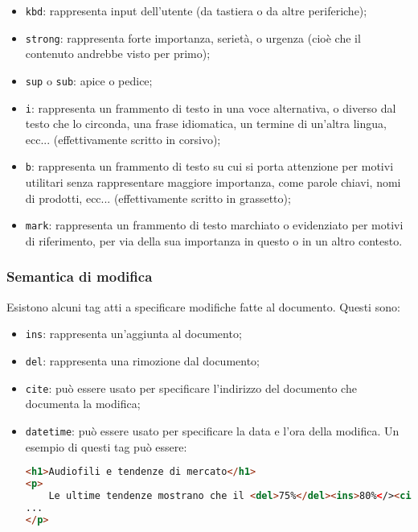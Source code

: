\documentclass[a4paper,11pt]{article}
\begin{document}
\begin{itemize}
	\item \lstinline|kbd|: rappresenta input dell'utente (da tastiera o da altre periferiche);
	\item \lstinline|strong|: rappresenta forte importanza, serietà, o urgenza (cioè che il contenuto andrebbe visto per primo);
	\item \lstinline|sup| o \lstinline|sub|: apice o pedice;
	\item \lstinline|i|: rappresenta un frammento di testo in una voce alternativa, o diverso dal testo che lo circonda, una frase idiomatica, un termine di un'altra lingua, ecc... (effettivamente scritto in corsivo);
	\item \lstinline|b|: rappresenta un frammento di testo su cui si porta attenzione per motivi utilitari senza rappresentare maggiore importanza, come parole chiavi, nomi di prodotti, ecc... (effettivamente scritto in grassetto);
	\item \lstinline|mark|: rappresenta un frammento di testo marchiato o evidenziato per motivi di riferimento, per via della sua importanza in questo o in un altro contesto.
\end{itemize}

\subsubsection{Semantica di modifica}
Esistono alcuni tag atti a specificare modifiche fatte al documento.
Questi sono:
\begin{itemize}
	\item \lstinline|ins|: rappresenta un'aggiunta al documento;
	\item \lstinline|del|: rappresenta una rimozione dal documento;
	\item \lstinline|cite|: può essere usato per specificare l'indirizzo del documento che documenta la modifica;
	\item \lstinline|datetime|: può essere usato per specificare la data e l'ora della modifica.
Un esempio di questi tag può essere:
\begin{lstlisting}[language=html, style=codestyle]	
<h1>Audiofili e tendenze di mercato</h1>
<p>
	Le ultime tendenze mostrano che il <del>75%</del><ins>80%</><cite>studio</cite> degli utenti di apparecchi audio non sa distinguere la differenza fra l'mp3 e un <del>disco in vinile</del><ins>cd</ins><datetime>02/03/2024</datetime>
...
</p>
\end{lstlisting}
\end{itemize}
\end{document}
